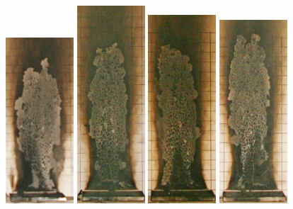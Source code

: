 \documentclass[twoside]{uocthesis}
\begin{document}
\begin{figure}[p]
	\includegraphics[width=1.0in]{../Figures/GBGAS_03_IMG_5575}
	\includegraphics[width=1.0in]{../Figures/GBGAS_14_IMG_5814}
	\includegraphics[width=1.0in]{../Figures/GBGAS_15_IMG_5835}
	\includegraphics[width=1.0in]{../Figures/GBGAS_16_IMG_5855}

\end{figure}
\end{document}
